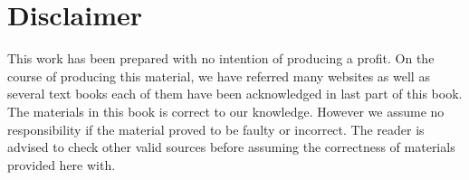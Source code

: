 \section*{\huge {Disclaimer}}
This work has been prepared with no intention of producing a profit.
On the course of producing this material, we have referred many websites as well as several text books each of them have been acknowledged in last part of this book.
The materials in this book is correct to our knowledge.
However we assume no responsibility if the material proved to be faulty or incorrect.
The reader is advised to check other valid sources before assuming the correctness of materials provided here with.
